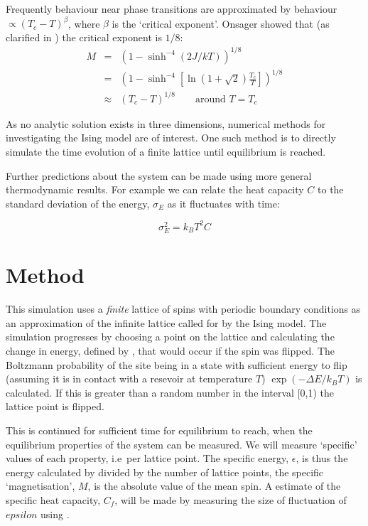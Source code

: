 \documentclass[12pt,a4paper,english]{article}
\begin{document}
Frequently behaviour near phase transitions are approximated by behaviour $\propto \left( T_c - T\right)^\beta$, where $\beta$ is the `critical exponent'. Onsager showed that (as clarified in \cite{montroll63}) the critical exponent is $1/8$:
\begin{eqnarray}
\label{eq:critical-exponent}
M & = & \left( 1- \sinh^{-4} \left(2J/kT \right) \right)^{1/8} \\
  & = & \left( 1- \sinh^{-4} \left[\ln \left(1+\sqrt{2}\right) \frac{T_c}{T} \right] \right)^{1/8} \\
  & \approx & \left( T_c - T \right)^{1/8} \qquad \textrm{around } T=T_c
\end{eqnarray}

As no analytic solution exists in three dimensions, numerical methods for investigating the Ising model are of interest.  One such method is to directly simulate the time evolution of a finite lattice until equilibrium is reached.

\medskip

Further predictions about the system can be made using more general thermodynamic results.  For example we can relate the heat capacity $C$ to the standard deviation of the energy, $\sigma_E$ as it fluctuates with time\cite{rosser82-e-fluc}:

\begin{equation}
\label{eq:e-fluc}
\sigma_E^2=k_B T^2 C
\end{equation}

\section{Method}
\label{sec:method}

This simulation uses a \emph{finite} lattice of spins with periodic boundary conditions as an approximation of the infinite lattice called for by the Ising model.  The simulation progresses by choosing a point on the lattice and calculating the change in energy, defined by , that would occur if the spin was flipped.  The Boltzmann probability of the site being in a state with sufficient energy to flip (assuming it is in contact with a resevoir at temperature $T$) $\exp\left(-\Delta E / k_B T\right)$ is calculated.  If this is greater than a random number in the interval [0,1) the lattice point is flipped.

This is continued for sufficient time for equilibrium to reach, when the equilibrium properties of the system can be measured.  We will measure `specific' values of each property, i.e\ per lattice point.  The specific energy, $\epsilon$, is thus the energy calculated by  divided by the number of lattice points, the specific `magnetisation', $M$, is the absolute value of the mean spin. A estimate of the specific heat capacity, $C_f$, will be made by measuring the size of fluctuation of $epsilon$ using .
\end{document}
